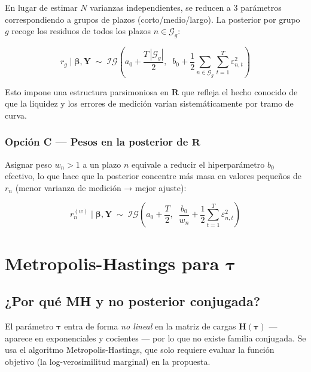 \documentclass[12pt, a4paper]{article}
\theoremstyle{plain}
\theoremstyle{definition}
\theoremstyle{remark}
\newcommand{\bbet}{\bm{\beta}}
\newcommand{\btau}{\bm{\tau}}
\newcommand{\bY}{\mathbf{Y}}
\newcommand{\bH}{\mathbf{H}}
\newcommand{\bR}{\mathbf{R}}
\newcommand{\IG}{\mathcal{IG}}
\begin{document}
En lugar de estimar $N$ varianzas independientes, se reducen a 3 parámetros
correspondiendo a grupos de plazos (corto/medio/largo). La posterior por grupo $g$
recoge los residuos de todos los plazos $n \in \mathcal{G}_g$:

\begin{equation}
  r_g \mid \bbet, \bY \;\sim\;
  \IG\!\left(a_0 + \frac{T\,|\mathcal{G}_g|}{2},\;\;
    b_0 + \frac{1}{2}\sum_{n \in \mathcal{G}_g}\sum_{t=1}^T\varepsilon_{n,t}^2\right)
  \label{eq:post_r_groups}
\end{equation}

Esto impone una estructura parsimoniosa en $\bR$ que refleja el hecho
conocido de que la liquidez y los errores de medición varían sistemáticamente
por tramo de curva.

\subsubsection{Opción C — Pesos en la posterior de $\bR$}

Asignar peso $w_n > 1$ a un plazo $n$ equivale a reducir el hiperparámetro
$b_0$ efectivo, lo que hace que la posterior concentre más masa en valores
pequeños de $r_n$ (menor varianza de medición → mejor ajuste):

\begin{equation}
  r_n^{(w)} \mid \bbet, \bY \;\sim\;
  \IG\!\left(a_0 + \frac{T}{2},\;\;
    \frac{b_0}{w_n} + \frac{1}{2}\sum_{t=1}^T\varepsilon_{n,t}^2\right)
  \label{eq:post_r_weighted}
\end{equation}

\section[Metropolis-Hastings para $\tau$]{Metropolis-Hastings para $\btau$}

\subsection{¿Por qué MH y no posterior conjugada?}

El parámetro $\btau$ entra de forma \emph{no lineal} en la matriz de cargas
$\bH(\btau)$ — aparece en exponenciales y cocientes — por lo que no existe
familia conjugada. Se usa el algoritmo Metropolis-Hastings, que solo requiere
evaluar la función objetivo (la log-verosimilitud marginal) en la propuesta.
\end{document}
